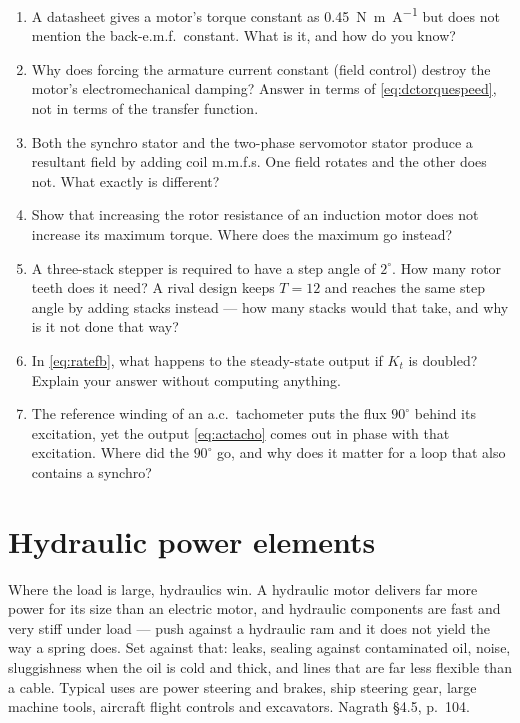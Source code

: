 \documentclass[11pt,a4paper]{article}
\begin{document}
\begin{enumerate}[leftmargin=2em,itemsep=2pt]
\item A datasheet gives a motor's torque constant as
      \SI{0.45}{\newton\metre\per\ampere} but does not mention the back-e.m.f.\
      constant. What is it, and how do you know?
\item Why does forcing the armature current constant (field control) destroy
      the motor's electromechanical damping? Answer in terms of
      \eqref{eq:dctorquespeed}, not in terms of the transfer function.
\item Both the synchro stator and the two-phase servomotor stator produce a
      resultant field by adding coil m.m.f.s. One field rotates and the other
      does not. What exactly is different?
\item Show that increasing the rotor resistance of an induction motor does not
      increase its maximum torque. Where does the maximum go instead?
\item A three-stack stepper is required to have a step angle of $2^\circ$.
      How many rotor teeth does it need? A rival design keeps $T=12$ and
      reaches the same step angle by adding stacks instead --- how many stacks
      would that take, and why is it not done that way?
\item In \eqref{eq:ratefb}, what happens to the steady-state output if
      $K_{t}$ is doubled? Explain your answer without computing anything.
\item The reference winding of an a.c.\ tachometer puts the flux $90^\circ$
      behind its excitation, yet the output \eqref{eq:actacho} comes out in
      phase with that excitation. Where did the $90^\circ$ go, and why does it
      matter for a loop that also contains a synchro?
\end{enumerate}


\section{Hydraulic power elements}
\label{sec:hydraulics}

Where the load is large, hydraulics win. A hydraulic motor delivers far more
power for its size than an electric motor, and hydraulic components are fast
and very stiff under load --- push against a hydraulic ram and it does not
yield the way a spring does. Set against that: leaks, sealing against
contaminated oil, noise, sluggishness when the oil is cold and thick, and
lines that are far less flexible than a cable. Typical uses are power
steering and brakes, ship steering gear, large machine tools, aircraft flight
controls and excavators. Nagrath \S4.5, p.~104.
\end{document}
